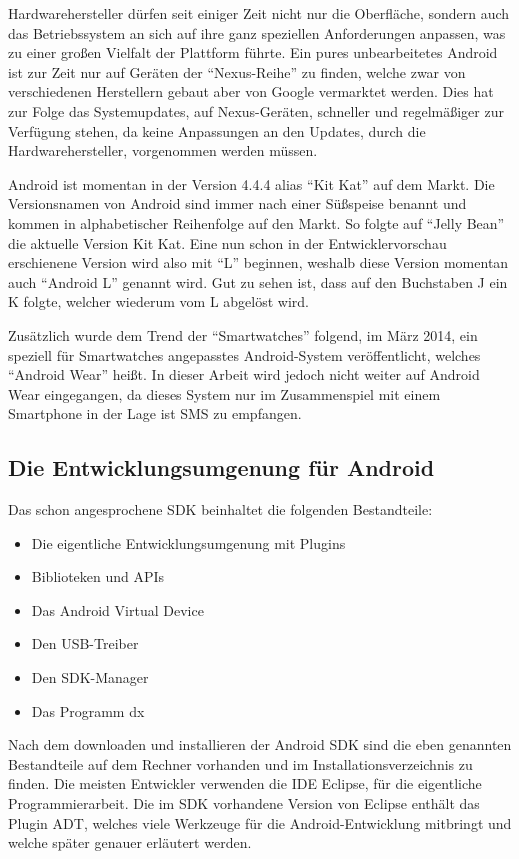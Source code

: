 Hardwarehersteller d\"urfen seit einiger Zeit nicht nur die Oberfl\"ache, sondern auch das Betriebssystem an sich auf ihre ganz speziellen Anforderungen anpassen, was zu einer gro\ss{}en Vielfalt der Plattform f\"uhrte. Ein pures unbearbeitetes Android ist zur Zeit nur auf Ger\"aten der "`Nexus-Reihe"' zu finden, welche zwar von verschiedenen Herstellern gebaut aber von Google vermarktet werden. Dies hat zur Folge das Systemupdates, auf Nexus-Ger\"aten, schneller und regelm\"a\ss{}iger zur Verf\"ugung stehen, da keine Anpassungen an den Updates, durch die Hardwarehersteller, vorgenommen werden m\"ussen.

Android ist momentan in der Version 4.4.4 alias "`Kit Kat"' auf dem Markt. Die Versionsnamen von Android sind immer nach einer S\"u\ss{}speise benannt und kommen in alphabetischer Reihenfolge auf den Markt. So folgte auf "`Jelly Bean"' die aktuelle Version Kit Kat. Eine nun schon in der Entwicklervorschau erschienene Version wird also mit "`L"' beginnen, weshalb diese Version momentan auch "`Android L"' genannt wird. Gut zu sehen ist, dass auf den Buchstaben J ein K folgte, welcher wiederum vom L abgel\"ost wird. \cite{WikiAndroid} \cite{Jung13}

Zus\"atzlich wurde dem Trend der "`Smartwatches"' folgend, im M\"arz 2014, ein speziell f\"ur Smartwatches angepasstes Android-System ver\"offentlicht, welches "`Android Wear"' hei\ss{}t. In dieser Arbeit wird jedoch nicht weiter auf Android Wear eingegangen, da dieses System nur im Zusammenspiel mit einem Smartphone in der Lage ist SMS zu empfangen. \cite{NextAndroidWear}

\subsection{Die Entwicklungsumgenung f\"ur Android}
Das schon angesprochene \ac{SDK} beinhaltet die folgenden Bestandteile:
\begin{itemize}
 \item Die eigentliche Entwicklungsumgenung mit Plugins
 \item Biblioteken und APIs
 \item Das Android Virtual Device
 \item Den USB-Treiber 
 \item Den SDK-Manager
 \item Das Programm dx
 
\end{itemize}

Nach dem downloaden und installieren der Android \ac{SDK} sind die eben genannten Bestandteile auf dem Rechner vorhanden und im Installationsverzeichnis zu finden. Die meisten Entwickler verwenden die \ac{IDE} Eclipse, f\"ur die eigentliche Programmierarbeit. Die im \ac{SDK} vorhandene Version von Eclipse enth\"alt das Plugin \ac{ADT}, welches viele Werkzeuge f\"ur die Android-Entwicklung mitbringt und welche sp\"ater genauer erl\"autert werden.

